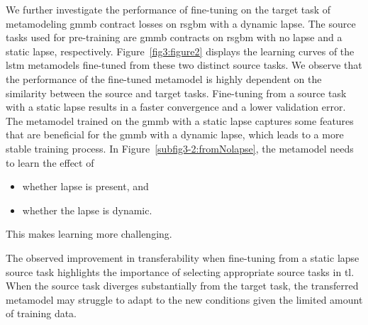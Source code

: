 We further investigate the performance of fine-tuning on the target task of metamodeling \gls{gmmb} contract losses on \gls{rsgbm} with a dynamic lapse. 
The source tasks used for pre-training are \gls{gmmb} contracts on \gls{rsgbm} with no lapse and a static lapse, respectively. 
Figure~\ref{fig3:figure2} displays the learning curves of the \gls{lstm} metamodels fine-tuned from these two distinct source tasks.
We observe that the performance of the fine-tuned metamodel is highly dependent on the similarity between the source and target tasks.
Fine-tuning from a source task with a static lapse results in a faster convergence and a lower validation error.
The metamodel trained on the \gls{gmmb} with a static lapse captures some features that are beneficial for the \gls{gmmb} with a dynamic lapse, which leads to a more stable training process.
In Figure~\ref{subfig3-2:fromNolapse}, the metamodel needs to learn the effect of 

\begin{itemize}
    \item whether lapse is present, and
    \item whether the lapse is dynamic.
\end{itemize}
This makes learning more challenging.

The observed improvement in transferability when fine-tuning from a static lapse source task highlights the importance of selecting appropriate source tasks in \gls{tl}. 
When the source task diverges substantially from the target task, the transferred metamodel may struggle to adapt to the new conditions given the limited amount of training data.


